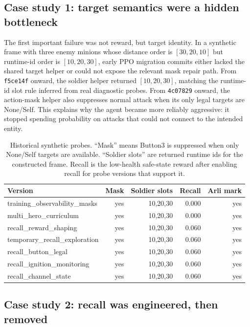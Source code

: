 \documentclass{article}
\begin{document}
\subsection{Case study 1: target semantics were a hidden bottleneck}

The first important failure was not reward, but target identity. In a synthetic frame with three enemy minions whose distance order is $[30,20,10]$ but runtime-id order is $[10,20,30]$, early PPO migration commits either lacked the shared target helper or could not expose the relevant mask repair path. From \texttt{f5ce14f} onward, the soldier helper returned $[10,20,30]$, matching the runtime-id slot rule inferred from real diagnostic probes. From \texttt{4c07829} onward, the action-mask helper also suppresses normal attack when its only legal targets are None/Self. This explains why the agent became more reliably aggressive: it stopped spending probability on attacks that could not connect to the intended entity.

\begin{table}[t]
  \centering
  \caption{Historical synthetic probes. ``Mask'' means Button3 is suppressed when only None/Self targets are available. ``Soldier slots'' are returned runtime ids for the constructed frame. Recall is the low-health safe-state reward after enabling recall for probe versions that support it.}
  \label{tab:probes}
  \small
  \begin{tabular}{lrrrr}
    \toprule
    Version & Mask & Soldier slots & Recall & Arli mark \\
    \midrule
    training\_observability\_masks & yes & 10,20,30 & 0.000 & yes \\
    multi\_hero\_curriculum & yes & 10,20,30 & 0.000 & yes \\
    recall\_reward\_shaping & yes & 10,20,30 & 0.060 & yes \\
    temporary\_recall\_exploration & yes & 10,20,30 & 0.060 & yes \\
    recall\_button\_legal & yes & 10,20,30 & 0.060 & yes \\
    recall\_ignition\_monitoring & yes & 10,20,30 & 0.060 & yes \\
    recall\_channel\_state & yes & 10,20,30 & 0.060 & yes \\
    \bottomrule
  \end{tabular}
\end{table}

\subsection{Case study 2: recall was engineered, then removed}
\end{document}
